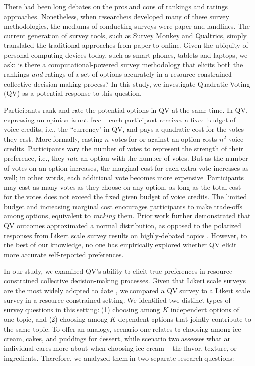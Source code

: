 There had been long debates on the pros and cons of rankings and ratings approaches. Nonetheless, when researchers developed many of these survey methodologies, the mediums of conducting surveys were paper and landlines. The current generation of survey tools, such as Survey Monkey and Qualtrics, simply translated the traditional approaches from paper to online. Given the ubiquity of personal computing devices today, such as smart phones, tablets and laptops, we ask: is there a computational-powered survey methodology that elicits both the rankings \textit{and} ratings of a set of options accurately in a resource-constrained collective decision-making process? In this study, we investigate Quadratic Voting (QV) \cite{posner2018radical} as a potential response to this question. 

Participants rank and rate the potential options in QV at the same time. In QV, expressing an opinion is not free -- each participant receives a fixed budget of voice credits, i.e., the ``currency" in QV, and pays a quadratic cost for the votes they cast. More formally, casting $n$ votes for or against an option costs $n^2$ voice credits. Participants vary the number of votes to represent the strength of their preference, i.e., they \textit{rate} an option with the number of votes. But as the number of votes on an option increases, the marginal cost for each extra vote increases as well; in other words, each additional vote becomes more expensive. Participants may cast as many votes as they choose on any option, as long as the total cost for the votes does not exceed the fixed given budget of voice credits. The limited budget and increasing marginal cost encourages participants to make trade-offs among options, equivalent to \textit{ranking} them. Prior work further demonstrated that QV outcomes approximated a normal distribution, as opposed to the polarized responses from Likert scale survey results on highly-debated topics \cite{quarfoot2017quadratic}. However, to the best of our knowledge, no one has empirically explored whether QV elicit more accurate self-reported preferences.

In our study, we examined QV's ability to elicit true preferences in resource-constrained collective decision-making processes. Given that Likert scale surveys are the most widely adopted to date \cite{moors2016two}, we compared a QV survey to a Likert scale survey \cite{likert1932technique} in a resource-constrained setting. We identified two distinct types of survey questions in this setting: (1) choosing among $K$ independent options of one topic, and (2) choosing among $K$ dependent options that jointly contribute to the same topic. To offer an analogy, scenario one relates to choosing among ice cream, cakes, and puddings for dessert, while scenario two assesses what an individual cares more about when choosing ice cream -- the flavor, texture, or ingredients. Therefore, we analyzed them in two separate research questions:


